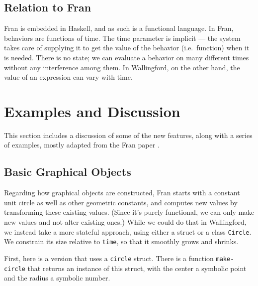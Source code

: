 \documentclass{article}
\begin{document}
\subsection{Relation to Fran}

Fran is embedded in Haskell, and as such is a functional language.  In
Fran, behaviors are functions of time.  The time parameter is implicit ---
the system takes care of supplying it to get the value of the behavior
(i.e.\ function) when it is needed.  There is no state; we can evaluate a
behavior on many different times without any interference among them.  In
Wallingford, on the other hand, the value of an expression can vary with
time.

\section{Examples and Discussion}

This section includes a discussion of some of the new features, along with
a series of examples, mostly adapted from the Fran paper
\cite{elliot-icfp-1997}.

\subsection{Basic Graphical Objects}
\label{sec:basic-graphics}

Regarding how graphical objects are constructed, Fran starts with a
constant unit circle as well as other geometric constants, and computes new
values by transforming these existing values.  (Since it's purely
functional, we can only make new values and not alter existing ones.)
While we could do that in Wallingford, we instead take a more stateful
approach, using either a struct or a class \verb|Circle|.  We constrain its
size relative to \verb|time|, so that it smoothly grows and shrinks.


First, here is a version that uses a \verb|circle| struct.  There is a
function \verb|make-circle| that returns an instance of this struct, with
the center a symbolic point and the radius a symbolic number.
\end{document}
